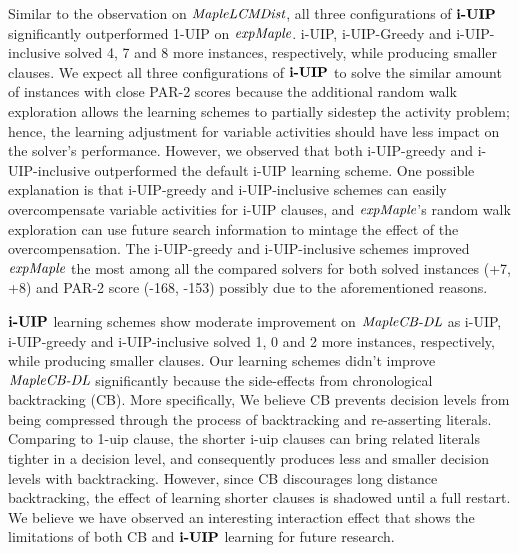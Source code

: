 Similar to the observation on $\textit{MapleLCMDist}$, all three configurations of $\textbf{i-UIP}$ significantly outperformed 1-UIP on $\textit{expMaple}$. i-UIP, i-UIP-Greedy and i-UIP-inclusive solved 4, 7 and 8 more instances, respectively, while producing smaller clauses. We expect all three configurations of $\textbf{i-UIP}$ to solve the similar amount of instances with close PAR-2 scores because the additional random walk exploration allows the learning schemes to partially sidestep the activity problem; hence, the learning adjustment for variable activities should have less impact on the solver's performance. However, we observed that both i-UIP-greedy and i-UIP-inclusive outperformed the default i-UIP learning scheme. One possible explanation is that i-UIP-greedy and i-UIP-inclusive schemes can easily overcompensate variable activities for i-UIP clauses, and $\textit{expMaple}$'s random walk exploration can use future search information to mintage the effect of the overcompensation. The i-UIP-greedy and i-UIP-inclusive schemes improved $\textit{expMaple}$ the most among all the compared solvers for both solved instances (+7, +8) and PAR-2 score (-168, -153) possibly due to the aforementioned reasons.

$\textbf{i-UIP}$ learning schemes show moderate improvement on $\textit{MapleCB-DL}$ as i-UIP, i-UIP-greedy and i-UIP-inclusive solved 1, 0 and 2 more instances, respectively, while producing smaller clauses. Our learning schemes didn't improve $\textit{MapleCB-DL}$ significantly because the side-effects from chronological backtracking (CB). More specifically, We believe CB prevents decision levels from being compressed through the process of backtracking and re-asserting literals. Comparing to 1-uip clause, the shorter i-uip clauses can bring related literals tighter in a decision level, and consequently produces less and smaller decision levels with  backtracking. However, since CB discourages long distance backtracking, the effect of learning shorter clauses is shadowed until a full restart.  We believe we have observed an interesting interaction effect that shows the limitations of both CB and $\textbf{i-UIP}$ learning for future research.